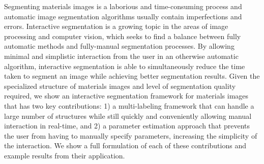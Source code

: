 Segmenting materials images is a laborious and time-consuming process
and automatic image segmentation algorithms usually contain
imperfections and errors.  Interactive segmentation is a growing topic
in the areas of image processing and computer vision, which seeks to
find a balance between fully automatic methods and fully-manual
segmentation processes. By allowing minimal and simplistic interaction
from the user in an otherwise automatic algorithm, interactive
segmentation is able to simultaneously reduce the time taken to
segment an image while achieving better segmentation results. Given
the specialized structure of materials images and level of
segmentation quality required, we show an interactive segmentation
framework for materials images that has two key contributions: 1) a
multi-labeling framework that can handle a large number of structures
while still quickly and conveniently allowing manual interaction in
real-time, and 2) a parameter estimation approach that prevents the
user from having to manually specify parameters, increasing the
simplicity of the interaction.  We show a full formulation of each of
these contributions and example results from their application.
